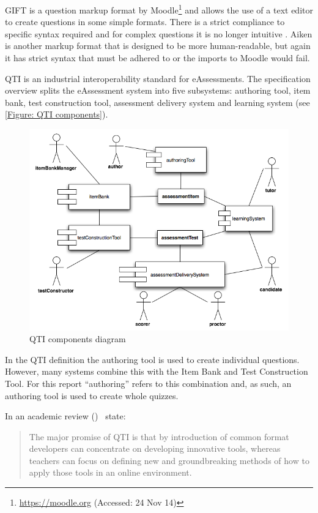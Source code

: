GIFT is a question markup format by Moodle\footnote{\url{https://moodle.org} (Accessed: 24 Nov 14)} and allows the use of a text editor to create questions in some simple formats. There is a strict compliance to specific syntax required and for complex questions it is no longer intuitive \citep{failQTI}. Aiken is another markup format that is designed to be more human-readable, but again it has strict syntax that must be adhered to or the imports to Moodle would fail.

\gls{QTI} is an industrial interoperability standard for \glspl{eAssessment}. The specification overview \citep{qtiOverview} splits the \gls{eAssessment} system into five subsystems: authoring tool, item bank, test construction tool, assessment delivery system and learning system (see \autoref{Figure: QTI components}).

\begin{figure}[h]
	\centering
	\includegraphics[scale=0.6]{../figures/componentsQTI.png}
	\caption{\label{Figure: QTI components} QTI components diagram \citep{qtiOverview}}
\end{figure}

In the \gls{QTI} definition the authoring tool is used to create individual questions. However, many systems combine this with the Item Bank and Test Construction Tool. For this report ``\gls{authoring}'' refers to this combination and, as such, an authoring tool is used to create whole quizzes.

In an academic review  (\citeyear{wikieassessment})~\citep{wikieassessment} state:
\begin{quote}
	The major promise of QTI is that by introduction of common format developers can concentrate on developing innovative tools, whereas teachers can focus on defining new and groundbreaking methods of how to apply those tools in an online environment.
\end{quote}

